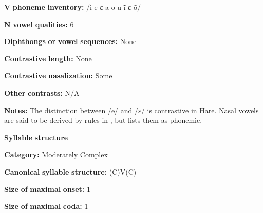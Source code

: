 \begin{styleBody}
\textbf{V} \textbf{phoneme} \textbf{inventory:} /i e ɛ a o u ĩ ɛ õ/
\end{styleBody}

\begin{styleBody}
\textbf{N} \textbf{vowel} \textbf{qualities:} 6
\end{styleBody}

\begin{styleBody}
\textbf{Diphthongs} \textbf{or} \textbf{vowel} \textbf{sequences:} None
\end{styleBody}

\begin{styleBody}
\textbf{Contrastive} \textbf{length:} None
\end{styleBody}

\begin{styleBody}
\textbf{Contrastive} \textbf{nasalization:} Some
\end{styleBody}

\begin{styleBody}
\textbf{Other} \textbf{contrasts:} N/A
\end{styleBody}

\begin{styleBody}
\textbf{Notes:} The distinction between /e/ and /ɛ/ is contrastive in Hare. Nasal vowels are said to be derived by rules in \citet{Rice1989}, but \citet{Rice2005} lists them as phonemic.
\end{styleBody}

\begin{styleBody}
\textbf{Syllable} \textbf{structure}
\end{styleBody}

\begin{styleBody}
\textbf{Category:} Moderately Complex
\end{styleBody}

\begin{styleBody}
\textbf{Canonical} \textbf{syllable} \textbf{structure:} (C)V(C) \citep[143-53]{Rice1989}
\end{styleBody}

\begin{styleBody}
\textbf{Size} \textbf{of} \textbf{maximal} \textbf{onset:} 1
\end{styleBody}

\begin{styleBody}
\textbf{Size} \textbf{of} \textbf{maximal} \textbf{coda:} 1
\end{styleBody}

